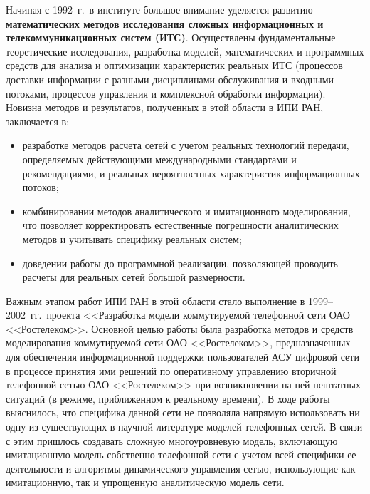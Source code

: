 \begin{multicols}{2}
     Начиная с 1992~г.\ в институте большое внимание уделяется
развитию \textbf{математических методов исследования сложных
информационных и телекоммуникационных систем (ИТС)}.
Осуществлены фундаментальные теоретические исследования,
разработка моделей, математических и программных средств для
анализа и оптимизации характеристик реальных ИТС (процессов
доставки информации с разными дисциплинами обслуживания и
входными потоками, процессов управления и комплексной
обработки информации). Новизна методов и результатов,
полученных в этой области в ИПИ РАН, заключается в:
     \begin{itemize}
\item разработке методов расчета сетей с учетом реальных
технологий передачи, определяемых действующими
международными стандартами и рекомендациями, и реальных
вероятностных характеристик информационных потоков;
\item комбинировании методов аналитического и имитационного
моделирования, что позволяет корректировать естественные
погрешности аналитических методов и учитывать специфику
реальных систем;
\item доведении работы до программной реализации,
позволяющей проводить расчеты для реальных сетей
большой размерности.
     \end{itemize}

     Важным этапом работ ИПИ РАН в этой области стало
выполнение в 1999--2002~гг.\ проекта <<Разработка модели
коммутируемой телефонной сети ОАО <<Ростелеком>>. Основной
целью работы была разработка методов и средств моделирования
коммутируемой сети ОАО <<Ростелеком>>, предназначенных для
обеспечения информационной поддержки пользователей АСУ
цифровой сети в процессе принятия ими решений по оперативному
управлению вторичной телефонной сетью ОАО <<Ростелеком>>
при возникновении на ней нештатных ситуаций (в режиме,
приближенном к реаль\-ному времени). В ходе работы выяснилось,
что специфика данной сети не позволяла напрямую использовать ни
одну из существующих в научной литературе моделей телефонных
сетей. В связи с этим пришлось создавать сложную
многоуровневую модель, включающую имитационную модель
собственно телефонной сети с учетом всей специфики ее
деятельности и алгоритмы динамического управ\-ле\-ния сетью,
использующие как имитационную, так и упрощенную
аналитическую модель сети.
{

}


\end{multicols}
